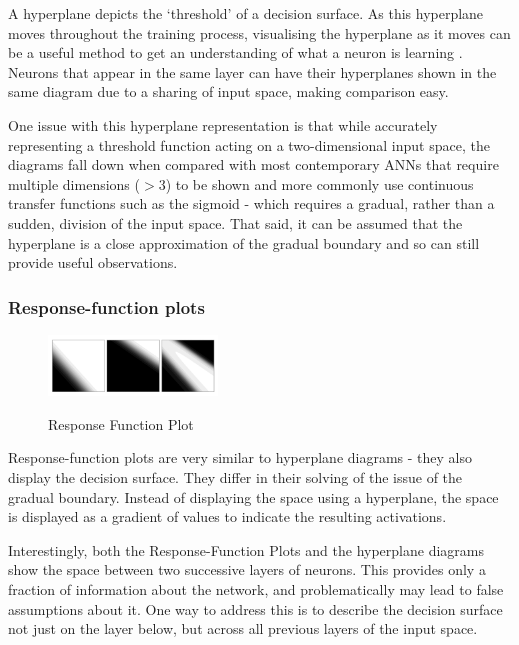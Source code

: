 \documentclass[a4paper,11pt,titlepage]{article}
\begin{document}
		A hyperplane depicts the `threshold' of a decision surface. As this hyperplane moves throughout the training process, visualising the hyperplane as it moves can be a useful method to get an understanding of what a neuron is learning \cite{Munro1992}. Neurons that appear in the same layer can have their hyperplanes shown in the same diagram due to a sharing of input space, making comparison easy.
		\par 
		One issue with this hyperplane representation is that while accurately representing a threshold function acting on a two-dimensional input space, the diagrams fall down when compared with most contemporary ANNs that require multiple dimensions ($>3$) to be shown and more commonly use continuous transfer functions such as  the sigmoid - which requires a gradual, rather than a sudden, division of the input space. That said, it can be assumed that the hyperplane is a close approximation of the gradual boundary and so can still provide useful observations.
		\par 
		
\subsubsection{Response-function plots}
		
 	\begin{figure}[H]
    			\centering	
			{{\includegraphics[width=0.4\textwidth]
    				{img/craven_gradient.png} 
    			}}%
    			\caption{Response Function Plot}%
    		\label{fig:bond}
	\end{figure} 
 		
		Response-function plots are very similar to hyperplane diagrams - they also display the decision surface. They differ in their solving of the issue of the gradual boundary. Instead of displaying the space using a hyperplane, the space is displayed as a gradient of values to indicate the resulting activations.
		\par 
		Interestingly, both the Response-Function Plots and the hyperplane diagrams show the space between two successive layers of neurons. This provides only a fraction of information about the network, and problematically may lead to false assumptions about it. One way to address this is to describe the decision surface not just on the layer below, but across all previous layers of the input space.
		\par 
		
\end{document}

